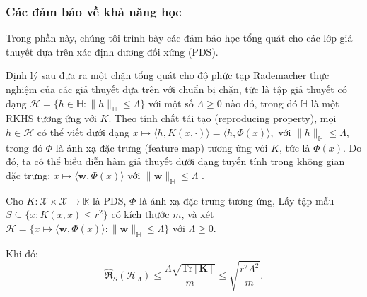 \subsubsection{Các đảm bảo về khả năng học}

Trong phần này, chúng tôi trình bày các đảm bảo học tổng quát cho các lớp giả thuyết dựa trên  xác định dương đối xứng (PDS).

Định lý sau đưa ra một chặn tổng quát cho độ phức tạp Rademacher thực nghiệm của các giả thuyết dựa trên  với chuẩn bị chặn, tức là tập giả thuyết có dạng
$\mathcal{H} = \{ h \in \mathbb{H} : \|h\|_{\mathbb{H}} \le \Lambda \}$ với một số $\Lambda \ge 0$ nào đó,
trong đó $\mathbb{H}$ là một RKHS tương ứng với  $K$.
Theo tính chất tái tạo (reproducing property), mọi $h \in \mathcal{H}$ có thể viết dưới dạng
$
x \mapsto \langle h, K(x,\cdot) \rangle = \langle h, \Phi(x) \rangle,
$ với $\|h\|_{\mathbb{H}} \le \Lambda$, 
trong đó $\Phi$ là ánh xạ đặc trưng (feature map) tương ứng với  $K$, tức là $ \Phi(x)$.
Do đó, ta có thể biểu diễn hàm giả thuyết dưới dạng tuyến tính trong không gian đặc trưng:
$x \mapsto \langle  \boldsymbol{w}, \Phi(x) \rangle$ với $\| \boldsymbol{w}\|_{\mathbb{H}} \le \Lambda$ .

\begin{thm}
Cho $K:\mathcal{X}\times\mathcal{X}\to\mathbb{R}$ là  PDS,
$\Phi$ là ánh xạ đặc trưng tương ứng,
Lấy tập mẫu $S \subseteq \{ x : K(x,x) \le r^2 \}$ có kích thước $m$, và xét
$
\mathcal{H} = \{ x \mapsto \langle \boldsymbol{w}, \Phi(x) \rangle : \|\boldsymbol{w}\|_{\mathbb{H}} \le \Lambda \}
$
với $\Lambda \ge 0$.

Khi đó:
\begin{equation}
\label{eq:rademacher-bound}
\widehat{\mathfrak{R}}_S(\mathcal{H}_\Lambda)
\le
\frac{\Lambda \sqrt{\mathrm{Tr}[\mathbf{K}]}}{m}
\le
\sqrt{\frac{r^2 \Lambda^2}{m}}.
\end{equation}
\label{thm:rademacher-kernel}
\end{thm}

